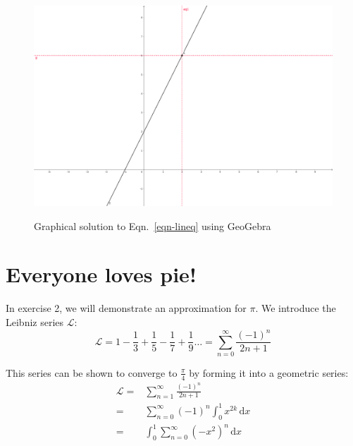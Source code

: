 \documentclass[11pt, a4paper]{article} %
\begin{document}
\begin{figure}[ht]
	\centering
	\includegraphics[width=.7\textwidth]{fig1-lineq.png}
	\label{fig-lineq}
	\caption{Graphical solution to Eqn.~\ref{eqn-lineq} using GeoGebra}
\end{figure}

\section{Everyone loves pie!}
In exercise 2, we will demonstrate an approximation for $\pi$. %
We introduce the Leibniz series $\mathcal{L}$:
$$ %
\mathcal{L} = %
1 - \frac{1}{3} + \frac{1}{5} - \frac{1}{7} + \frac{1}{9} \ldots %
= \sum_{n=0}^\infty \frac{(-1)^n}{2n + 1}%
$$

This series can be shown to converge to $\frac{\pi}{4}$ by forming it into a geometric series:
\begin{eqnarray*}
	\mathcal{L} =& \sum_{n=1}^\infty \frac{(-1)^n}{2n+1}\\
	=& \sum_{n=0}^\infty (-1)^n \int_0^1 x^{2k} \,\mathrm{d}x\\ %
	=& \int_0^1 \sum_{n=0}^\infty (-x^2)^n\,\mathrm{d}x
\end{eqnarray*}
\newcommand{\idx}{\,\mathrm{d}x}
\end{document}
